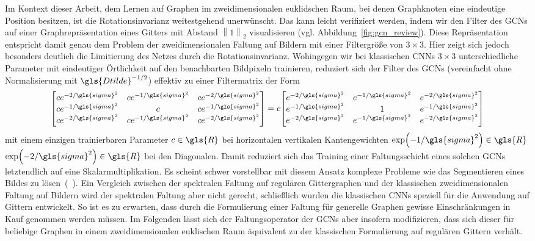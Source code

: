 Im Kontext dieser Arbeit, dem Lernen auf Graphen im zweidimensionalen euklidschen Raum, bei denen Graphknoten eine eindeutige Position besitzen, ist die Rotationsinvarianz weitestgehend unerwünscht.
Das kann leicht verifiziert werden, indem wir den Filter des \glspl{GCN} auf einer Graphrepräsentation eines Gitters mit Abstand $\left\|1\right\|_2$ visualisieren (vgl. Abbildung~\ref{fig:gcn_review}).
Diese Repräsentation entspricht damit genau dem Problem der zweidimensionalen Faltung auf Bildern mit einer Filtergröße von $3 \times 3$.
Hier zeigt sich jedoch besonders deutlich die Limitierung des Netzes durch die Rotationsinvarianz.
Wohingegen wir bei klassischen \glspl{CNN} $3 \times 3$ unterschiedliche Parameter mit eindeutiger Örtlichkeit auf den benachbarten Bildpixeln trainieren, reduziert sich der Filter des \glspl{GCN} (vereinfacht ohne Normalisierung mit $\gls{Dtilde}^{-1/2}$) effektiv zu einer Filtermatrix der Form
\begin{equation*}
  \begin{bmatrix}
    ce^{-2/\gls{sigma}^2} & ce^{-1/\gls{sigma}^2} & ce^{-2/\gls{sigma}^2}\\
    ce^{-1/\gls{sigma}^2} & c & ce^{-1/\gls{sigma}^2}\\
    ce^{-2/\gls{sigma}^2} & ce^{-1/\gls{sigma}^2} & ce^{-2/\gls{sigma}^2}
  \end{bmatrix} = c \begin{bmatrix}
    e^{-2/\gls{sigma}^2} & e^{-1/\gls{sigma}^2} & e^{-2/\gls{sigma}^2}\\
    e^{-1/\gls{sigma}^2} & 1 & e^{-1/\gls{sigma}^2}\\
    e^{-2/\gls{sigma}^2} & e^{-1/\gls{sigma}^2} & e^{-2/\gls{sigma}^2}
  \end{bmatrix}
\end{equation*}
mit einem einzigen trainierbaren Parameter $c \in \gls{R}$ bei horizontalen \bzw{} vertikalen Kantengewichten $\exp\left(-1/\gls{sigma}^2\right) \in \gls{R}$ \bzw{} $\exp\left(-2/\gls{sigma}^2\right) \in \gls{R}$ bei den Diagonalen.
Damit reduziert sich das Training einer Faltungsschicht eines solchen \glspl{GCN} letztendlich auf eine Skalarmultiplikation.
Es scheint schwer vorstellbar mit diesem Ansatz komplexe Probleme wie \zB{} das Segmentieren eines Bildes zu lösen~(\vgl{}~\cite{gcn_review}).
Ein Vergleich zwischen der spektralen Faltung auf regulären Gittergraphen und der klassischen zweidimensionalen Faltung auf Bildern wird der spektralen Faltung aber nicht gerecht, schließlich wurden die klassischen \glspl{CNN} speziell für die Anwendung auf Gittern entwickelt.
So ist es zu erwarten, dass durch die Formulierung einer Faltung für generelle Graphen gewisse Einschränkungen in Kauf genommen werden müssen.
Im Folgenden lässt sich der Faltungsoperator der \glspl{GCN} aber insofern modifizieren, dass sich dieser für beliebige Graphen in einem zweidimensionalen euklischen Raum äquivalent zu der klassischen Formulierung auf regulären Gittern verhält.

